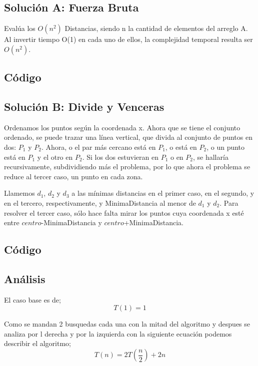 \documentclass[12pt, fleqn]{article}                             %
\theoremstyle{break}                                            %
\begin{document}
\subsection{Solución A: Fuerza Bruta}
Evalúa los $O(n^2)$ Distancias, siendo n
la cantidad de elementos del arreglo A. Al invertir tiempo O(1) en cada uno
de ellos, la complejidad temporal resulta ser $O(n^2)$. 
\subsection{Código}


\subsection{Solución B: Divide y Venceras}
Ordenamos los puntos según la coordenada x.
 Ahora que se tiene el conjunto ordenado, se puede trazar una línea vertical, que divida al conjunto de puntos en dos: $P_1$ y $P_2$. Ahora, o el par más cercano está en $P_1$, o está en $P_2$, o un punto está en $P_1$ y el otro en $P_2$. Si los dos estuvieran en $P_1$ o en $P_2$, se hallaría recursivamente, subdividiendo más el problema, por lo que ahora el problema se reduce al tercer caso, un punto en cada zona.

Llamemos $d_1$, $d_2$ y $d_3$ a las mínimas distancias en el primer caso, en el segundo, y en el tercero, respectivamente, y MinimaDistancia al menor de $d_1$ y $d_2$. Para resolver el tercer caso, sólo hace falta mirar los puntos cuya coordenada x esté entre $centro$-MinimaDistancia y $centro$+MinimaDistancia.


\subsection{Código}


\subsection{Análisis}
El caso base es de;
\begin{equation*}
    T(1)=1
\end{equation*}

Como se mandan 2 busquedas cada una con la mitad del algoritmo y despues se analiza por l derecha y por la izquierda
con la siguiente ecuación podemos describir el algoritmo;
\begin{equation*}
    T(n)=2T(\dfrac{n}{2})+2n
\end{equation*}
\end{document}
